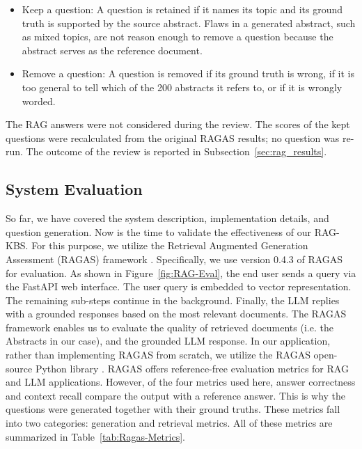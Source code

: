 \documentclass[bdcc,article,submit,pdftex,moreauthors]{Definitions/mdpi}
\begin{document}
\begin{itemize}
    \item Keep a question: A question is retained if it names its topic and its ground truth is supported by the source abstract. Flaws in a generated abstract, such as mixed topics, are not reason enough to remove a question because the abstract serves as the reference document. %
    
    \item Remove a question: A question is removed if its ground truth is wrong, if it is too general to tell which of the 200 abstracts it refers to, or if it is wrongly worded.
\end{itemize}

The RAG answers were not considered during the review. The scores of the kept questions were recalculated from the original RAGAS results; no question was re-run. The outcome of the review is reported in Subsection~\ref{sec:rag_results}.

\subsection{System Evaluation}

So far, we have covered the system description, implementation details, and question generation. Now is the time to validate the effectiveness of our RAG-KBS. For this purpose, we utilize the Retrieval
Augmented Generation Assessment (RAGAS) framework \cite{es2024ragas}. Specifically, we use version 0.4.3 of RAGAS for evaluation. 
As shown in Figure~\ref{fig:RAG-Eval}, the end user sends a query via the FastAPI \cite{lathkar2023getting} web interface. 
The user query is embedded to vector representation. The remaining sub-steps continue in the background. Finally, the LLM replies with a grounded responses based on the most relevant documents. The RAGAS framework enables us to evaluate the quality of retrieved documents (i.e. the Abstracts in our case), and the grounded LLM response. In our application, rather than implementing RAGAS from scratch, we utilize the RAGAS open-source Python library \cite{ragas2024}. RAGAS offers reference-free evaluation metrics for RAG and LLM applications. However, of the four metrics used here, answer correctness and context recall compare the output with a reference answer. This is why the questions were generated together with their ground truths. These metrics fall into two categories: generation and retrieval metrics. All of these metrics are summarized in Table~\ref{tab:Ragas-Metrics}. %
\end{document}
